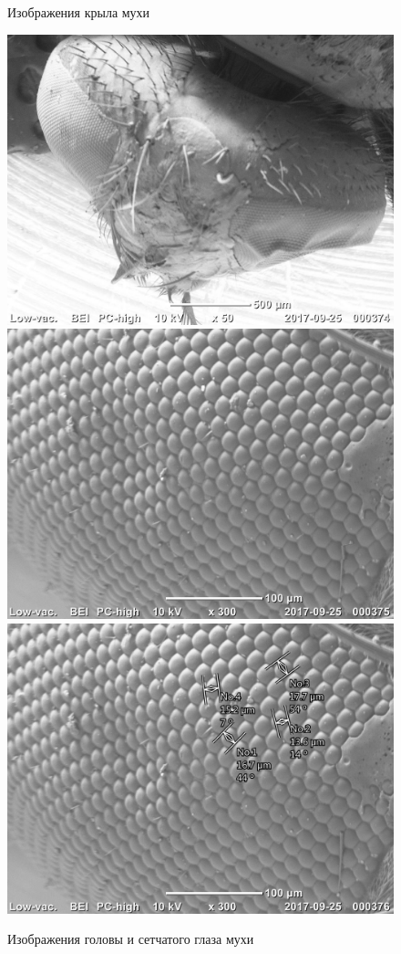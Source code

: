 \documentclass[12pt]{article}
\begin{document}
\begin{figure}
	\caption{Изображения крыла мухи}
	\vspace{0.2cm}
	\includegraphics[scale=0.65]{pictures/20170925_000374.jpg}
	\includegraphics[scale=0.65]{pictures/20170925_000375.jpg}
	\includegraphics[scale=0.65]{pictures/20170925_000376.jpg}
	\caption{Изображения головы и сетчатого глаза мухи}
\end{figure}
\end{document}
